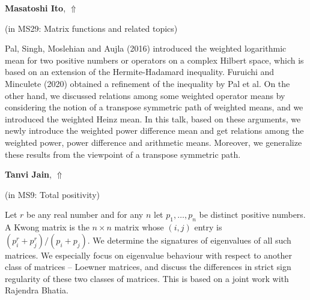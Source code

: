 \documentclass[ILAS2025-program.tex]{subfiles}
\begin{document}
\hypertarget{down0046}{}\begin{ilasabstract}
    
\textbf{Masatoshi Ito},  \hfill \hyperlink{up0046}{$\Uparrow$}
    
    
(in {\color{mstitle}MS29: Matrix functions and related topics})
        
\mtskip
    Pal, Singh, Moslehian and Aujla (2016) introduced the weighted logarithmic mean for two positive numbers
 or operators on a complex Hilbert space, which is based on an extension of the Hermite-Hadamard inequality.
Furuichi and Minculete (2020) obtained a refinement of the inequality by Pal et al.
On the other hand, we discussed relations among some weighted operator means
 by considering the notion of a transpose symmetric path of weighted means,
 and we introduced the weighted Heinz mean.
In this talk, based on these arguments,
 we  newly introduce the weighted power difference mean and get relations
 among the weighted power, power difference and arithmetic means.
Moreover, we generalize these results from the viewpoint of a transpose symmetric path.


\end{ilasabstract}
    

\hypertarget{down0045}{}\begin{ilasabstract}
    
\textbf{Tanvi Jain},  \hfill \hyperlink{up0045}{$\Uparrow$}
    
    
(in {\color{mstitle}MS9: Total positivity})
        
\mtskip
    Let $r$ be any real number and for any $n$ let $p_1,\ldots,p_n$ be distinct positive numbers. A Kwong matrix is the $n\times n$ matrix whose $(i,j)$ entry is $(p_i^r+p_j^r)/(p_i+p_j).$ We determine the signatures of eigenvalues of all such matrices. We especially focus on eigenvalue behaviour  with respect to another class of matrices -- Loewner matrices, and discuss the differences in strict sign regularity of these two classes of matrices. This is based on a joint work with Rajendra Bhatia.
\end{ilasabstract}
    
\end{document}
